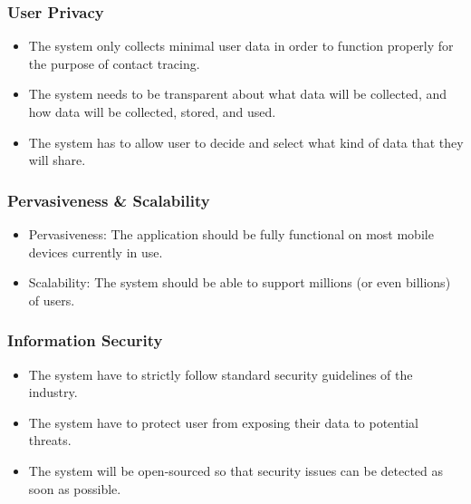     \subsubsection{User Privacy}
      \begin{itemize}
        \item The system only collects minimal user data in order to function properly for the purpose of contact tracing.
        \item The system needs to be transparent about what data will be collected, and how data will be collected, stored, and used.
        \item The system has to allow user to decide and select what kind of data that they will share.
      \end{itemize}
    
    \subsubsection{Pervasiveness \& Scalability}
      \begin{itemize}
        \item Pervasiveness: The application should be fully functional on most mobile devices currently in use.
        \item Scalability: The system should be able to support millions (or even billions) of users.
      \end{itemize}
    
    \subsubsection{Information Security}
      \begin{itemize}
        \item The system have to strictly follow standard security guidelines of the industry.
        \item The system have to protect user from exposing their data to potential threats.
        \item The system will be open-sourced so that security issues can be detected as soon as possible.
      \end{itemize}